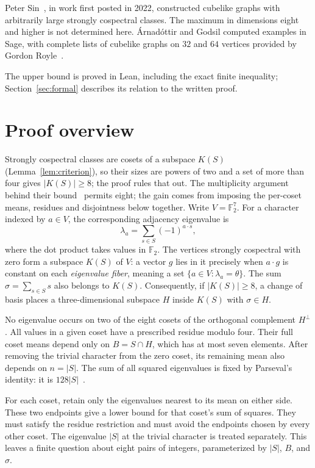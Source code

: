 \documentclass[11pt]{article}
\theoremstyle{definition}
\newcommand{\F}{\mathbb F}
\begin{document}
Peter Sin~\cite[Theorem~4.4]{Sin}, in work first posted in 2022,
constructed cubelike graphs with arbitrarily large strongly cospectral
classes. The maximum in dimensions eight and higher is not determined
here. \'Arnad\'ottir and Godsil computed examples in Sage, with complete
lists of cubelike graphs on $32$ and $64$ vertices provided by Gordon
Royle~\cite[Appendices~A--B and Acknowledgments]{AG}.

The upper bound is proved in Lean, including the exact finite inequality;
Section~\ref{sec:formal} describes its relation to the written proof.

\section{Proof overview}\label{sec:overview}
Strongly cospectral classes are cosets of a subspace $K(S)$
(Lemma~\ref{lem:criterion}), so their sizes are powers of two and a set
of more than four gives $|K(S)|\geq8$; the proof rules that out.
The multiplicity argument behind their
bound~\cite[Theorems~6.1 and~8.2]{AG} permits eight; the gain comes from imposing the
per-coset means, residues and disjointness below together.
Write $V=\F_2^7$. For a character indexed by $a\in V$, the corresponding
adjacency eigenvalue is
\[
 \lambda_a=\sum_{s\in S}(-1)^{a\cdot s},
\]
where the dot product takes values in $\F_2$.
The vertices strongly cospectral with zero form a subspace $K(S)$ of $V$:
a vector $g$ lies in it precisely when $a\cdot g$ is constant on each
\emph{eigenvalue fiber}, meaning a set $\{a\in V:\lambda_a=\theta\}$.
The sum $\sigma=\sum_{s\in S}s$ also belongs to $K(S)$.
Consequently, if $|K(S)|\geq8$, a change of basis places a
three-dimensional subspace $H$ inside $K(S)$ with $\sigma\in H$.

No eigenvalue occurs on two of the eight cosets of the orthogonal
complement $H^\perp$. All values in a given coset have a prescribed residue modulo
four. Their full coset means depend only on $B=S\cap H$, which has at
most seven elements. After removing the trivial character from the
zero coset, its remaining mean also depends on $n=|S|$.
The sum of all squared eigenvalues is fixed by Parseval's
identity: it is $128|S|$~\cite[Lemma~7.2]{AG}.

For each coset, retain only the eigenvalues nearest to its mean on either
side. These two endpoints give a lower bound for that coset's
sum of squares. They must satisfy the residue restriction and must avoid
the endpoints chosen by every other coset. The eigenvalue $|S|$ at the
trivial character is treated separately. This leaves a finite question
about eight pairs of integers, parameterized by $|S|$, $B$, and $\sigma$.
\end{document}
